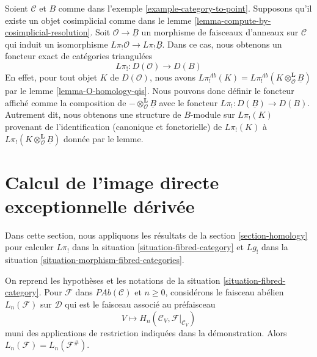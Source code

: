 \begin{remark}
\label{remark-O-homology-B-homology-general}
Soient $\mathcal{C}$ et $B$ comme dans
l'exemple \ref{example-category-to-point}. Supposons qu'il existe un objet
cosimplicial comme dans le
lemme \ref{lemma-compute-by-cosimplicial-resolution}.
Soit $\mathcal{O} \to \underline{B}$ un morphisme de faisceaux d'anneaux sur
$\mathcal{C}$ qui induit un isomorphisme
$L\pi_!\mathcal{O} \to L\pi_!\underline{B}$.
Dans ce cas, nous obtenons un foncteur exact de catégories triangulées
$$
L\pi_! : D(\mathcal{O}) \longrightarrow D(B)
$$
En effet, pour tout objet $K$ de $D(\mathcal{O})$, nous avons
$L\pi^{\textit{Ab}}_!(K) =
L\pi^{\textit{Ab}}_!(K \otimes_{\mathcal{O}}^\mathbf{L} \underline{B})$
par le lemme \ref{lemma-O-homology-qis}.
Nous pouvons donc définir le foncteur affiché comme la composition de
$- \otimes^\mathbf{L}_\mathcal{O} \underline{B}$ avec le foncteur
$L\pi_! : D(\underline{B}) \to D(B)$.
Autrement dit, nous obtenons une structure de $B$-module sur $L\pi_!(K)$
provenant de l'identification (canonique et fonctorielle) de $L\pi_!(K)$ à
$L\pi_!(K \otimes_\mathcal{O}^\mathbf{L} \underline{B})$ donnée par le
lemme.
\end{remark}







\section{Calcul de l'image directe exceptionnelle dérivée}
\label{section-calculate}

\noindent
Dans cette section, nous appliquons les résultats de la
section \ref{section-homology}
pour calculer
$L\pi_!$ dans la situation \ref{situation-fibred-category} et
$Lg_!$ dans la situation \ref{situation-morphism-fibred-categories}.

\begin{lemma}
\label{lemma-compute-left-derived-pi-shriek-pre}
On reprend les hypothèses et les notations de la situation \ref{situation-fibred-category}.
Pour $\mathcal{F}$ dans $\textit{PAb}(\mathcal{C})$ et $n \geq 0$,
considérons le faisceau abélien $L_n(\mathcal{F})$ sur $\mathcal{D}$
qui est le faisceau associé au préfaisceau
$$
V \longmapsto H_n(\mathcal{C}_V, \mathcal{F}|_{\mathcal{C}_V})
$$
muni des applications de restriction indiquées dans la démonstration. Alors
$L_n(\mathcal{F}) = L_n(\mathcal{F}^\#)$.
\end{lemma}

